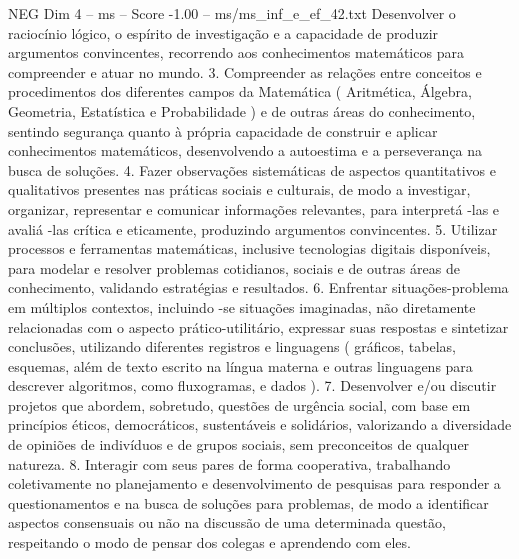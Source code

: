 \begin{textsample}{NEG Dim 4 – ms – Score -1.00 – ms/ms\_inf\_e\_ef\_42.txt}
Desenvolver o raciocínio lógico, o espírito de investigação e a capacidade de produzir argumentos convincentes, recorrendo aos conhecimentos matemáticos para compreender e atuar no mundo. 3.
Compreender as relações entre conceitos e procedimentos dos diferentes campos da Matemática ( Aritmética, Álgebra, Geometria, Estatística e Probabilidade ) e de outras áreas do conhecimento, sentindo segurança quanto à própria capacidade de construir e aplicar conhecimentos matemáticos, desenvolvendo a autoestima e a perseverança na busca de soluções. 4.
Fazer observações sistemáticas de aspectos quantitativos e qualitativos presentes nas práticas sociais e culturais, de modo a investigar, organizar, representar e comunicar informações relevantes, para interpretá -las e avaliá -las crítica e eticamente, produzindo argumentos convincentes. 5.
Utilizar processos e ferramentas matemáticas, inclusive tecnologias digitais disponíveis, para modelar e resolver problemas cotidianos, sociais e de outras áreas de conhecimento, validando estratégias e resultados. 6.
Enfrentar situações-problema em múltiplos contextos, incluindo -se situações imaginadas, não diretamente relacionadas com o aspecto prático-utilitário, expressar suas respostas e sintetizar conclusões, utilizando diferentes registros e linguagens ( gráficos, tabelas, esquemas, além de texto escrito na língua materna e outras linguagens para descrever algoritmos, como fluxogramas, e dados ). 7.
Desenvolver e/ou discutir projetos que abordem, sobretudo, questões de urgência social, com base em princípios éticos, democráticos, sustentáveis e solidários, valorizando a diversidade de opiniões de indivíduos e de grupos sociais, sem preconceitos de qualquer natureza. 8.
Interagir com seus pares de forma cooperativa, trabalhando coletivamente no planejamento e desenvolvimento de pesquisas para responder a questionamentos e na busca de soluções para problemas, de modo a identificar aspectos consensuais ou não na discussão de uma determinada questão, respeitando o modo de pensar dos colegas e aprendendo com eles.

\end{textsample}
